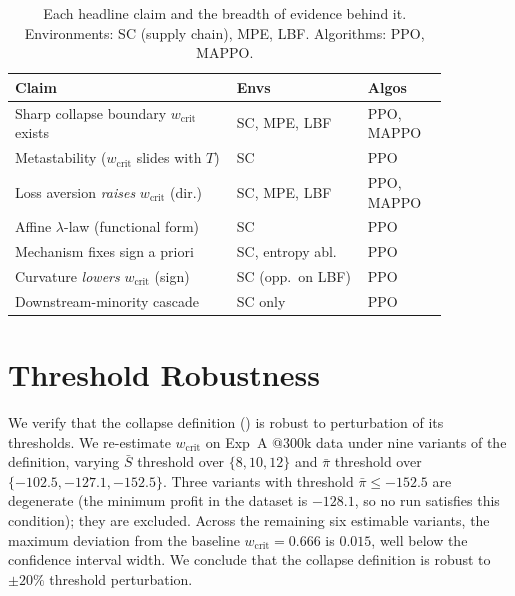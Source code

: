 \documentclass[letterpaper]{article}
\theoremstyle{plain}
\newcommand{\wcrit}{w_{\mathrm{crit}}}
\begin{document}
\begin{table}[h]
\centering
\caption{Each headline claim and the breadth of evidence behind it.
Environments: SC (supply chain), MPE, LBF. Algorithms: PPO, MAPPO.}
\label{tab:claim_ledger}
\small
\begin{tabular}{p{0.44\linewidth}p{0.26\linewidth}p{0.16\linewidth}}
\toprule
Claim & Envs & Algos \\
\midrule
Sharp collapse boundary $\wcrit$ exists & SC, MPE, LBF & PPO, MAPPO \\
Metastability ($\wcrit$ slides with $T$) & SC & PPO \\
Loss aversion \emph{raises} $\wcrit$ (dir.) & SC, MPE, LBF & PPO, MAPPO \\
Affine $\lambda$-law (functional form) & SC & PPO \\
Mechanism fixes sign a priori & SC, entropy abl. & PPO \\
Curvature \emph{lowers} $\wcrit$ (sign) & SC (opp.\ on LBF) & PPO \\
Downstream-minority cascade & SC only & PPO \\
\bottomrule
\end{tabular}
\end{table}

\section{Threshold Robustness}
\label{sec:appendix_robustness}

We verify that the collapse definition () is robust to
perturbation of its thresholds.
We re-estimate $\wcrit$ on Exp~A @300k data under nine variants of the
definition, varying $\bar{S}$ threshold over $\{8, 10, 12\}$ and
$\bar{\pi}$ threshold over $\{-102.5, -127.1, -152.5\}$.
Three variants with threshold $\bar{\pi} \leq -152.5$ are degenerate
(the minimum profit in the dataset is $-128.1$, so no run satisfies
this condition); they are excluded.
Across the remaining six estimable variants, the maximum deviation from
the baseline $\wcrit = 0.666$ is $0.015$, well below the confidence
interval width.
We conclude that the collapse definition is robust to $\pm 20\%$ threshold
perturbation.

\end{document}
